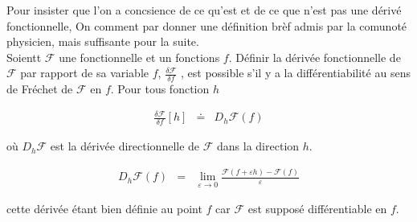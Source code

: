Pour insister que l'on a concsience de ce qu'est et de ce que n'est pas une dérivé fonctionnelle, On comment par donner une définition brèf admis par la comunoté physicien, mais suffisante pour la suite. \\

Soientt $\mathcal{F}$ une fonctionnelle et un fonctions $f$. Définir la dérivée fonctionnelle de $\mathcal{F}$ par rapport de sa variable $f$, $\frac{\delta \mathcal{F}}{\delta f}$ ,  est possible s'il y a la différentiabilité au sens de Fréchet de $\mathcal{F}$ en $f$. Pour tous fonction $h$ 

\begin{eqnarray*}
	\frac{\delta \mathcal{F}}{\delta f}[h] & \doteq & D_h \mathcal{F}(f)	
\end{eqnarray*}

où $D_h \mathcal{F}$ est la dérivée directionnelle de $\mathcal{F}$ dans la direction $h$.

\begin{eqnarray*}
	D_h \mathcal{F}(f) & = & \lim_{\varepsilon \to 0 } \frac{ \mathcal{F} ( f + \varepsilon h ) - \mathcal{F} ( f) }{\varepsilon}	
\end{eqnarray*}

cette dérivée étant bien définie au point $f$ car $\mathcal{F}$ est supposé différentiable en $f$.
